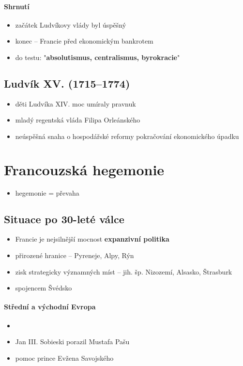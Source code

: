 \paragraph{Shrnutí}
\begin{itemize}
\item začátek Ludvíkovy vlády byl úspěšný
\item konec -- Francie před ekonomickým bankrotem
\item do testu: "\textbf{absolutismus, centralismus, byrokracie}"
\end{itemize}

\subsection{Ludvík XV. (1715--1774)}
\begin{itemize}
\item děti Ludvíka XIV. moc umíraly \ra pravnuk
\item mladý \ra regentská vláda Filipa Orleánského
\item neúspěšná snaha o hospodářské reformy \ra pokračování ekonomického úpadku
\end{itemize}




\section{Francouzská hegemonie}
\begin{itemize}
\item hegemonie = převaha
\end{itemize}
\subsection{Situace po 30-leté válce}
\begin{itemize}
\item Francie je nejsilnější mocnost \ra \textbf{expanzivní politika}
\item přirozené hranice -- Pyreneje, Alpy, Rýn
\item zisk strategicky významných míst -- jih. šp. Nizozemí, Alsasko, Štrasburk
\item spojencem Švédsko
\end{itemize}

\paragraph{Střední a východní Evropa}
\begin{itemize}
\item {}
\item Jan III. Sobieski porazil Mustafa Pašu
\item pomoc prince Evžena Savojského
\end{itemize}

